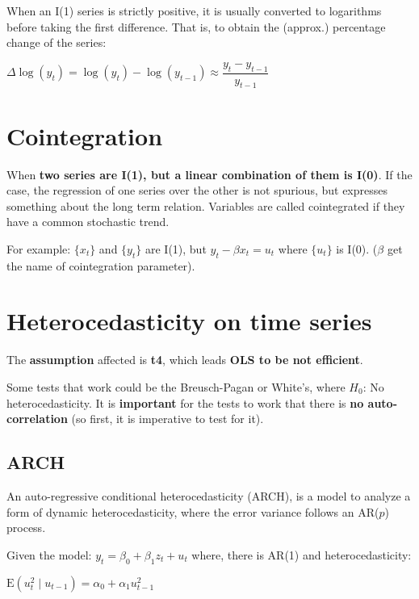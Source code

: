 \documentclass[10pt, a4paper, landscape]{extarticle}
\newcommand{\E}{\mathrm{E}}
\begin{document}
\begin{multicols}{3}
When an I(1) series is strictly positive, it is usually converted to logarithms before taking the first difference. That is, to obtain the (approx.) percentage change of the series:

\begin{center}
	$\Delta \log(y_t) = \log(y_t) - \log(y_{t - 1}) \approx \dfrac{y_t - y_{t - 1}}{y_{t - 1}}$
\end{center}

\columnbreak

\section*{Cointegration}

When \textbf{two series are I(1), but a linear combination of them is I(0)}. If the case, the regression of one series over the other is not spurious, but expresses something about the long term relation. Variables are called cointegrated if they have a common stochastic trend.

For example: $\lbrace x_t \rbrace$ and $\lbrace y_t \rbrace$ are I(1), but $y_t - \beta x_t = u_t$ where $\lbrace u_t \rbrace$ is I(0). ($\beta$ get the name of cointegration parameter).

\section*{Heterocedasticity on time series}

The \textbf{assumption} affected is \textbf{t4}, which leads \textbf{OLS to be not efficient}.

Some tests that work could be the Breusch-Pagan or White's, where $H_0$: No heterocedasticity. It is \textbf{important} for the tests to work that there is \textbf{no auto-correlation} (so first, it is imperative to test for it).

\subsection*{ARCH}

An auto-regressive conditional heterocedasticity (ARCH), is a model to analyze a form of dynamic heterocedasticity, where the error variance follows an AR($p$) process.

Given the model: $y_t = \beta_0 + \beta_1 z_t + u_t$ where, there is AR(1) and heterocedasticity:

\begin{center}
	$\E(u^2_t \mid u_{t - 1}) = \alpha_0 + \alpha_1 u^2_{t - 1}$
\end{center}


\end{multicols}
\end{document}
